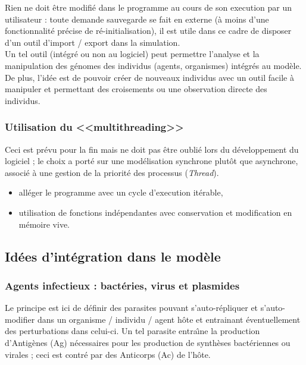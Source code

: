 \documentclass[11pt,twoside,a4paper]{article}
\begin{document}
Rien ne doit {\^e}tre modifi{\'e} dans le programme au cours de son execution par un utilisateur : toute demande sauvegarde se fait en externe ({\`a} moins d'une fonctionnalit{\'e} pr{\'e}cise de r{\'e}-initialisation), il est utile dans ce cadre de disposer d'un outil d'import / export dans la simulation.~\\

Un tel outil (int{\'e}gr{\'e} ou non au logiciel) peut permettre l'analyse et la manipulation des g{\'e}nomes des individus (agents, organismes) int{\'e}gr{\'e}s au mod{\`e}le. De plus, l'id{\'e}e est de pouvoir cr{\'e}er de nouveaux individus avec un outil facile {\`a} manipuler et permettant des croisements ou une observation directe des individus. 

\subsubsection{Utilisation du <<multithreading>>}

Ceci est pr{\'e}vu pour la fin mais ne doit pas {\^e}tre oubli{\'e} lors du d{\'e}veloppement du logiciel ; le choix a port{\'e} sur une mod{\'e}lisation synchrone plut{\^o}t que asynchrone, associ{\'e} {\`a} une gestion de la priorit{\'e} des processus (\textit{Thread}).
\begin{itemize}
	\item all{\'e}ger le programme avec un cycle d'execution it{\'e}rable, 
	\item utilisation de fonctions ind{\'e}pendantes avec conservation et modification en m{\'e}moire vive.
\end{itemize}

\subsection{Id{\'e}es d'int{\'e}gration dans le mod{\`e}le}

\subsubsection{Agents infectieux : bact{\'e}ries, virus et plasmides}

Le principe est ici de d{\'e}finir des parasites pouvant s'auto-r{\'e}pliquer et s'auto-modifier dans un organisme / individu / agent h{\^o}te et entrainant {\'e}ventuellement des perturbations dans celui-ci. Un tel parasite entra{\^\i}ne la production d'Antig{\`e}nes (Ag) n{\'e}cessaires pour les production de synth{\`e}ses bact{\'e}riennes ou virales ; ceci est contr{\'e} par des Anticorps (Ac) de l'h{\^o}te.~\\
\end{document}
